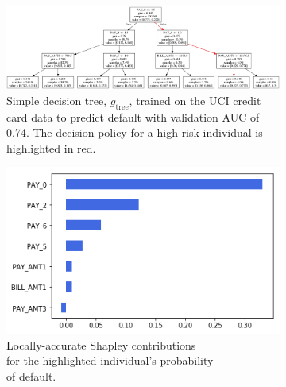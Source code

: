 \documentclass[fleqn]{article}
\begin{document}
\begin{figure}[ht!]
	\begin{subfigure}{.6\textwidth}
		\includegraphics[height=.45\linewidth, width=1.15\linewidth]{img/dt.png}
  		\caption{Simple decision tree, $g_{\text{tree}}$, trained on the UCI credit card data to predict default with validation AUC of 0.74. The decision policy for a high-risk individual is highlighted in red.}
  		\label{fig:dt}
	\end{subfigure}\hspace{50pt}
	\begin{subfigure}{.4\textwidth}
		\vspace{30pt}
  		\includegraphics[height=.5\linewidth, width=.8\linewidth]{img/shap.png}
  		\vspace{5pt}
  		\caption{Locally-accurate Shapley contributions\\ for the highlighted individual's probability\\ of default.}
  		\label{fig:shap}
	\end{subfigure}
	\caption{}
	\label{fig:dt_shap}
\end{figure}
\end{document}
